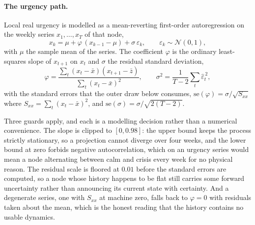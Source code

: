 \paragraph{The urgency path.}
Local real urgency is modelled as a mean-reverting first-order autoregression on the weekly
series $x_1, \ldots, x_T$ of that node,
\begin{equation}
    x_{k} = \mu + \varphi\,(x_{k-1} - \mu) + \sigma\,\varepsilon_k,
    \qquad \varepsilon_k \sim \mathcal{N}(0,1),
    \label{eq:ar1}
\end{equation}
with $\mu$ the sample mean of the series. The coefficient $\varphi$ is the ordinary
least-squares slope of $x_{t+1}$ on $x_t$ and $\sigma$ the residual standard deviation,
\begin{equation}
    \varphi = \frac{\sum_t (x_t - \bar{x})(x_{t+1} - \bar{z})}{\sum_t (x_t - \bar{x})^2},
    \qquad
    \sigma^2 = \frac{1}{T-2}\sum_t \hat{\varepsilon}_t^{\,2},
    \label{eq:ar1_fit}
\end{equation}
with the standard errors that the outer draw below consumes,
$\mathrm{se}(\varphi) = \sigma / \sqrt{S_{xx}}$ where $S_{xx} = \sum_t (x_t-\bar{x})^2$, and
$\mathrm{se}(\sigma) = \sigma / \sqrt{2(T-2)}$.

Three guards apply, and each is a modelling decision rather than a numerical convenience.
The slope is clipped to $[0, 0.98]$: the upper bound keeps the process strictly stationary,
so a projection cannot diverge over four weeks, and the lower bound at zero forbids negative
autocorrelation, which on an urgency series would mean a node alternating between calm and
crisis every week for no physical reason. The residual scale is floored at $0.01$ before the
standard errors are computed, so a node whose history happens to be flat still carries some
forward uncertainty rather than announcing its current state with certainty. And a
degenerate series, one with $S_{xx}$ at machine zero, falls back to $\varphi = 0$ with
residuals taken about the mean, which is the honest reading that the history contains no
usable dynamics.

